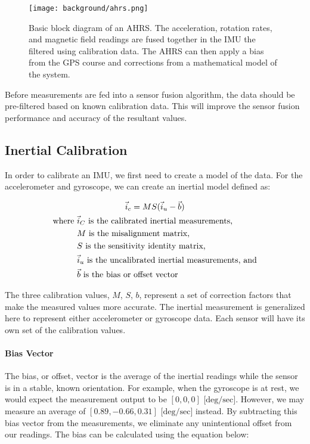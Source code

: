 \begin{figure}[h!]
    \caption[AHRS block diagram]{Basic block diagram of an AHRS. 
    The acceleration, rotation rates, and magnetic field readings are fused together in the IMU the filtered using calibration data. 
    The AHRS can then apply a bias from the GPS course and corrections from a mathematical model of the system.}
    \label{fig:ahrs_design}
    \centering
    \texttt{[image: background/ahrs.png]}
\end{figure}

Before measurements are fed into a sensor fusion algorithm, the data should be pre-filtered based on known calibration data.
This will improve the sensor fusion performance and accuracy of the resultant values.

\subsection{Inertial Calibration}

In order to calibrate an IMU, we first need to create a model of the data. For the accelerometer and gyroscope, we can create an inertial model defined as:

\begin{gather} \label{eq:inertial_model}
    \vec{i}_c=MS(\vec{i}_u-\vec{b}) \\
    \begin{aligned}
        \text{where } & \vec{i}_C \text{ is the calibrated inertial measurements,} \\ 
        & M \text{ is the misalignment matrix,} \\
        & S \text{ is the sensitivity identity matrix,} \\
        & \vec{i}_u \text{ is the uncalibrated inertial measurements, and} \\
        & \vec{b} \text{ is the bias or offset vector}
    \end{aligned} \notag
\end{gather}

The three calibration values, $M$, $S$, $b$, represent a set of correction factors that make the measured values more accurate. The inertial measurement is generalized here to represent either accelerometer or gyroscope data. Each sensor will have its own set of the calibration values.

\paragraph*{Bias Vector} The bias, or offset, vector is the average of the inertial readings while the sensor is in a stable, known orientation. For example, when the gyroscope is at rest, we would expect the measurement output to be $[0,0,0] \text{ [deg/sec]}$. However, we may measure an average of $[0.89, -0.66, 0.31] \text{ [deg/sec]}$ instead. By subtracting this bias vector from the measurements, we eliminate any unintentional offset from our readings. The bias can be calculated using the equation below:

